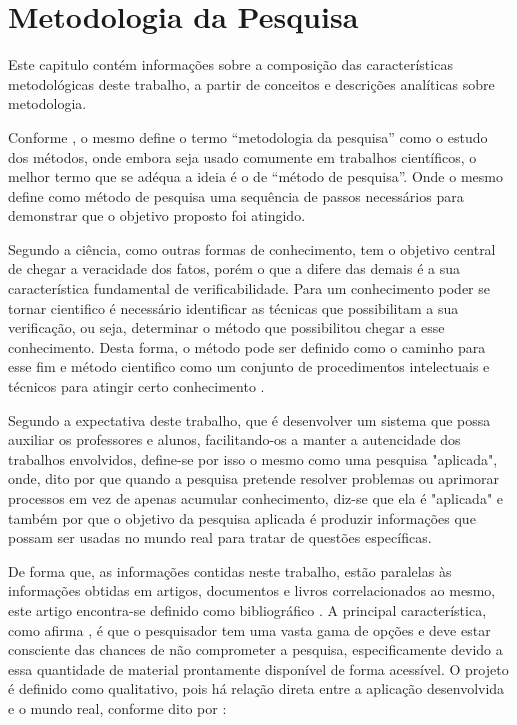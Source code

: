\chapter{Metodologia da Pesquisa}

Este capitulo contém informações sobre a composição das características metodológicas deste trabalho, a partir de conceitos e descrições analíticas sobre metodologia.

Conforme \textcite{wazlawick2009}, o mesmo define o termo “metodologia da pesquisa” como o estudo dos métodos, onde embora seja usado comumente em trabalhos científicos, o melhor termo que se adéqua a ideia é o de “método de pesquisa”. Onde o mesmo define como método de pesquisa uma sequência de passos necessários para demonstrar que o objetivo proposto foi atingido.

Segundo \textcite{gil2017} a ciência, como outras formas de conhecimento, tem o objetivo central de chegar a veracidade dos fatos, porém o que a difere das demais é a sua característica fundamental de verificabilidade. Para um conhecimento poder se tornar cientifico é necessário identificar as técnicas que possibilitam a sua verificação, ou seja, determinar o método que possibilitou chegar a esse conhecimento. Desta forma, o método pode ser definido como o caminho para esse fim e método cientifico como um conjunto de procedimentos intelectuais e técnicos para atingir certo conhecimento \cite{gil2017}.


Segundo a expectativa deste trabalho, que é desenvolver um sistema que possa auxiliar os professores e alunos, facilitando-os a manter a autencidade dos trabalhos envolvidos, define-se por isso o mesmo como uma pesquisa "aplicada", onde, dito por \textcite{gil2017} que quando a pesquisa pretende resolver problemas ou aprimorar processos em vez de apenas acumular conhecimento, diz-se que ela é "aplicada" e também por \textcite{prodanov2013} que o objetivo da pesquisa aplicada é produzir informações que possam ser usadas no mundo real para tratar de questões específicas.

De forma que, as informações contidas neste trabalho, estão paralelas às informações obtidas em artigos, documentos e livros correlacionados ao mesmo, este artigo encontra-se definido como bibliográfico \cite{prodanov2013}. A principal característica, como afirma \textcite{gil2017}, é que o pesquisador tem uma vasta gama de opções e deve estar consciente das chances de não comprometer a pesquisa, especificamente devido a essa quantidade de material prontamente disponível de forma acessível.
O projeto é definido como qualitativo, pois há relação direta entre a aplicação desenvolvida e o mundo real, conforme dito por \textcite{prodanov2013}:

